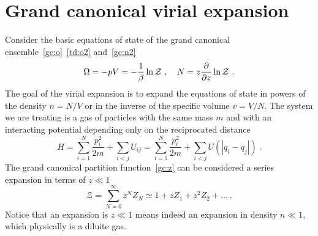 \section{Grand canonical virial expansion} 

    Consider the basic equations of state of the grand canonical ensemble~\eqref{gc:o}~\eqref{td:o2} and~\eqref{gc:n2} 
    \begin{equation}\label{gc:es}
        \Omega = - pV = - \frac{1}{\beta} \ln \mathcal Z~, \quad N = z \frac{\partial}{\partial z} \ln \mathcal Z ~.
    \end{equation}
    The goal of the virial expansion is to expand the equations of state in powers of the density $n = N/V$ or in the inverse of the specific volume $v = V / N$. The system we are treating is a gas of particles with the same mass $m$ and with an interacting potential depending only on the reciprocated distance 
    \begin{equation*}
        H = \sum_{i=1}^N \frac{p_i^2}{2m} + \sum_{i < j} U_{ij} = \sum_{i=1}^N \frac{p_i^2}{2m} + \sum_{i < j} U (|q_i - q_j|) ~.
    \end{equation*}
    The grand canonical partition function~\eqref{gc:z} can be considered a series expansion in terms of $z \ll 1$ 
    \begin{equation*}
        \mathcal Z = \sum_{N=0}^\infty z^N Z_N \simeq 1 + z Z_1 + z^2 Z_2 + \ldots ~.
    \end{equation*}
    Notice that an expansion is $z \ll 1$ means indeed an expansion in density $n \ll 1$, which physically is a diluite gas.


